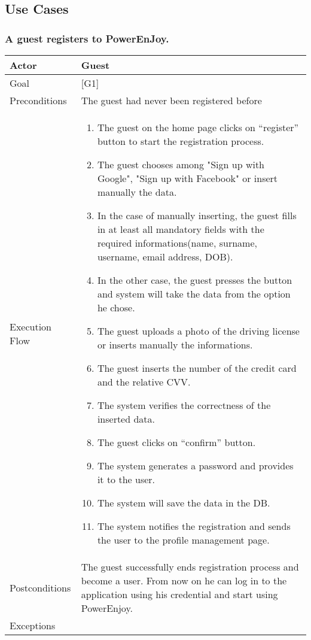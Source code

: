 \documentclass[english]{article}
\begin{document}
\subsection{Use Cases}
	\subsubsection{A guest registers to PowerEnJoy.}
	\begin{tabularx}{\textwidth}{  l  X  }
		\hline
		Actor & Guest\\
		\hline
		Goal & [G1]\\
		\hline
		Preconditions & The guest had never been registered before\\
		\hline
		Execution Flow & \begin{enumerate}
			\item{The guest on the home page clicks on “register” button to start the registration process.}
			\item{The guest chooses among "Sign up with Google", "Sign up with Facebook" or insert manually the data.}
			\item{In the case of manually inserting, the guest fills in at least all mandatory fields with the required informations(name, surname, username, email address, DOB).}
			\item{In the other case, the guest presses the button and system will take the data from the option he chose.}
			\item{The guest uploads a photo of the driving license or inserts manually the informations.}
			\item{The guest inserts the number of the credit card and the relative CVV}.
			\item{The system verifies the correctness of the inserted data.}
			\item{The guest clicks on “confirm” button.}
			\item{The system generates a password and provides it to the user.}
			\item{The system will save the data in the DB.}
			\item{The system notifies the registration and sends the user to the profile management page.}
		\end{enumerate}\\
		\hline
		Postconditions & The guest successfully ends registration process and become a user. From now on he can log in to the application using his credential and start using PowerEnjoy.\\
		\hline
		Exceptions & \begin{enumerate}

\end{enumerate}
\end{tabularx}
\end{document}
